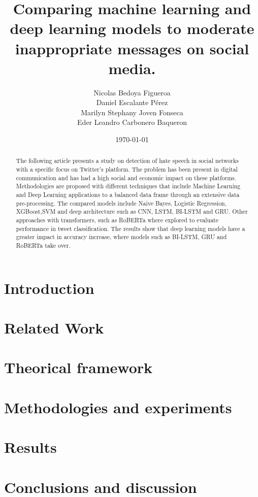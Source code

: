 \documentclass[conference]{IEEEtran}
\title{Comparing machine learning and deep learning models to moderate inappropriate messages on social media.}
\author{Nicolas Bedoya Figueroa \\
Daniel Escalante Pérez \\
Marilyn Stephany Joven Fonseca \\
Eder Leandro Carbonero Baqueron \\}
\date{\today}
\begin{document}
\maketitle
\begin{abstract}
The following article presents a study on detection of hate speech in social networks with a specific focus on Twitter's platform. The problem has been present in digital communication and has had a high social and economic impact on these platforms. Methodologies are proposed with different techniques that include Machine Learning and Deep Learning applications to a balanced data frame through an extensive data pre-processing. The compared models include Naive Bayes, Logistic Regression, XGBoost,SVM and deep architecture such as CNN, LSTM, BI-LSTM and GRU. Other approaches with transformers, such as RoBERTa where explored to evaluate performance in tweet classification. The results show that deep learning models have a greater impact in accuracy increase, where models such as BI-LSTM, GRU and RoBERTa take over.
\end{abstract}

\section{Introduction}


\section{Related Work}


\section{Theorical framework}


\section{Methodologies and experiments}
\label{sec:methodologies}


\section{Results}


\section{Conclusions and discussion}




\end{document}
